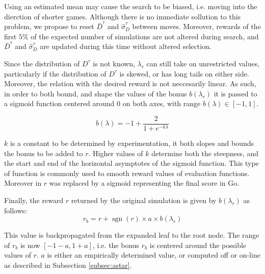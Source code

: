 \documentclass{ecai2014}
\newcommand{\sgn}{\mathop{\mathrm{sgn}}}
\begin{document}
Using an estimated mean may cause the search to be biased, i.e. moving into the dierction of shorter games. Although there is no immediate sollution to this problem, we propose to reset $\bar{D}^\tau$ and $\hat{\sigma}^\tau_D$ between moves. Moreover, rewards of the first $5\%$ of the expected number of simulations are not altered during search, and $\bar{D}^\tau$ and $\hat{\sigma}^\tau_D$ are updated during this time without altered selection.

Since the distribution of $D^\tau$ is not known, $\lambda_r$ can still take on unrestricted values, particularly if the distribution of $D^\tau$ is skewed, or has long tails on either side. Moreover, the relation with the desired reward is not neccesarily linear. As such, in order to both bound, and shape the values of the bonus $b(\lambda_r)$ it is passed to a sigmoid function centered around $0$ on both axes, with range $b(\lambda) \in [-1, 1]$. 

\begin{equation}
b(\lambda)=-1+\frac{2}{1+e^{-k\lambda}}
\label{eq:sigmoid}
\end{equation}

$k$ is a constant to be determined by experimentation, it both slopes and bounds the bonus to be added to $r$. Higher values of $k$ determine both the steepness, and the start and end of the horizontal asymptotes of the sigmoid function. This type of function is commonly used to smooth reward values of evaluation functions. Moreover in \cite{shibahara2008combining} $r$ was replaced by a sigmoid representing the final score in Go.

Finally, the reward $r$ returned by the original simulation is given by $b(\lambda_r)$ as follows:
\begin{equation}
r_b=r+\sgn(r)\times a \times b(\lambda_r)
\end{equation}

This value is backpropagated from the expanded leaf to the root node. The range of $r_b$ is now $[-1-a, 1+a]$, i.e. the bonus $r_b$ is centered around the possible values of $r$. $a$ is either an empirically determined value, or computed off or on-line as described in Subsection \ref{subsec:astar}.
\end{document}
